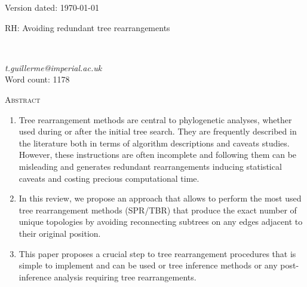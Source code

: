 \documentclass[12pt,letterpaper]{article}
\renewcommand{\section}[1]{%
\bigskip
\begin{center}
\begin{Large}
\normalfont\scshape #1
\medskip
\end{Large}
\end{center}}
\begin{document}
\begin{flushright}
Version dated: \today
\end{flushright}
\bigskip
\noindent RH: Avoiding redundant tree rearrangements

\bigskip
\medskip
\begin{center}

\bigskip

\\
\end{center}
\medskip
{} \textit{t.guillerme@imperial.ac.uk}\\ 
\medskip
Word count: 1178
\vspace{1in}

\modulolinenumbers[1]
\linenumbers

%
%

\newpage
\section{Abstract}
\begin{enumerate}
    \item Tree rearrangement methods are central to phylogenetic analyses, whether used during or after the initial tree search. They are frequently described in the literature both in terms of algorithm descriptions and caveats studies. However, these instructions are often incomplete and following them can be misleading and generates redundant rearrangements inducing statistical caveats and costing precious computational time.
    \item In this review, we propose an approach that allows to perform the most used tree rearrangement methods (SPR/TBR) that produce the exact number of unique topologies by avoiding reconnecting subtrees on any edges adjacent to their original position.
    \item This paper proposes a crucial step to tree rearrangement procedures that is simple to implement and can be used or tree inference methods or any post-inference analysis requiring tree rearrangements.
\end{enumerate}
\end{document}
